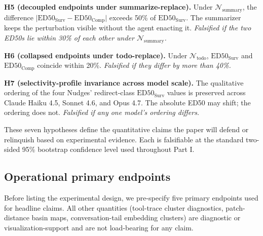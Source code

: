\documentclass{article}
\theoremstyle{plain}
\theoremstyle{definition}
\begin{document}
\textbf{H5 (decoupled endpoints under summarize-replace).} Under $\mathcal{N}_\text{summary}$, the difference $\bigl|\text{ED50}_\text{Surv} - \text{ED50}_\text{Comp}\bigr|$ exceeds 50\% of $\text{ED50}_\text{Surv}$. The summarizer keeps the perturbation visible without the agent enacting it. \textit{Falsified if the two ED50s lie within 30\% of each other under $\mathcal{N}_\text{summary}$.}

\textbf{H6 (collapsed endpoints under todo-replace).} Under $\mathcal{N}_\text{todo}$, $\text{ED50}_\text{Surv}$ and $\text{ED50}_\text{Comp}$ coincide within 20\%. \textit{Falsified if they differ by more than 40\%.}

\textbf{H7 (selectivity-profile invariance across model scale).} The qualitative ordering of the four Nudges' redirect-class $\text{ED50}_\text{Surv}$ values is preserved across Claude Haiku 4.5, Sonnet 4.6, and Opus 4.7. The absolute ED50 may shift; the ordering does not. \textit{Falsified if any one model's ordering differs.}

These seven hypotheses define the quantitative claims the paper will defend or relinquish based on experimental evidence. Each is falsifiable at the standard two-sided 95\% bootstrap confidence level used throughout Part I.

\subsection{Operational primary endpoints}

Before listing the experimental design, we pre-specify five primary endpoints used for headline claims. All other quantities (tool-trace cluster diagnostics, patch-distance basin maps, conversation-tail embedding clusters) are diagnostic or visualization-support and are not load-bearing for any claim.
\end{document}
